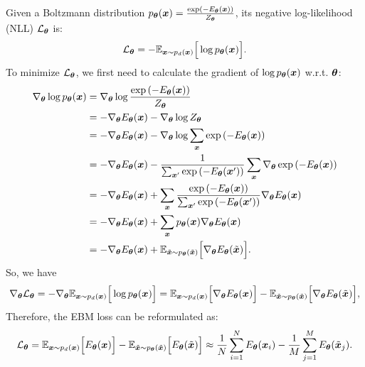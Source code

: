 Given a Boltzmann distribution $p_{{\bm{\theta}}}({\bm{x}}) = \frac{\exp (-E_{{\bm{\theta}}}({\bm{x}}))}{Z_{{\bm{\theta}}}}$, 
its negative log-likelihood (NLL) $\mathcal{L}_{{\bm{\theta}}}$ is:
\begin{equation*}
\begin{aligned}
    \mathcal{L}_{{\bm{\theta}}} = -{\mathbb{E}}_{{\bm{x}} \sim p_d({\bm{x}})} \Big[ \log p_{{\bm{\theta}}}({\bm{x}}) \Big].
\end{aligned}
\end{equation*}
To minimize $\mathcal{L}_{{\bm{\theta}}}$, we first need to calculate the gradient of $\log p_{{\bm{\theta}}}({\bm{x}})$ w.r.t. ${\bm{\theta}}$:
\begin{equation*}
\begin{aligned}
    \nabla_{\bm{\theta}} \log p_{\bm{\theta}}({\bm{x}})
    &= \nabla_{\bm{\theta}} \log \frac{\exp{(-E_{\bm{\theta}}({\bm{x}}))}} {Z_{\bm{\theta}}} \\
    &= -\nabla_{\bm{\theta}} E_{\bm{\theta}}({\bm{x}}) - \nabla_{\bm{\theta}} \log Z_{\bm{\theta}} \\
    &= -\nabla_{\bm{\theta}} E_{\bm{\theta}}({\bm{x}}) - \nabla_{\bm{\theta}} \log \sum_{{\bm{x}}} \exp{(-E_{\bm{\theta}}({\bm{x}}))} \\
    &= -\nabla_{\bm{\theta}} E_{\bm{\theta}}({\bm{x}}) - \frac{1}{\sum_{{\bm{x}}'}\exp{(-E_{\bm{\theta}}({\bm{x}}'))}} \sum_{{\bm{x}}} \nabla_{\bm{\theta}} \exp{(-E_{\bm{\theta}}({\bm{x}}))} \\
    &= -\nabla_{\bm{\theta}} E_{\bm{\theta}}({\bm{x}}) + \sum_{{\bm{x}}} \frac{\exp{(-E_{\bm{\theta}}({\bm{x}}))}}{\sum_{{\bm{x}}'}\exp{(-E_{\bm{\theta}}({\bm{x}}'))}} \nabla_{\bm{\theta}} E_{\bm{\theta}}({\bm{x}}) \\
    &= -\nabla_{\bm{\theta}} E_{\bm{\theta}}({\bm{x}}) + \sum_{{\bm{x}}} p_{{\bm{\theta}}}({\bm{x}}) \nabla_{\bm{\theta}} E_{\bm{\theta}}({\bm{x}}) \\
    &= -\nabla_{\bm{\theta}} E_{\bm{\theta}}({\bm{x}}) + {\mathbb{E}}_{\Tilde{{\bm{x}}} \sim p_{{\bm{\theta}}}(\Tilde{{\bm{x}}})} \Big[ \nabla_{\bm{\theta}} E_{\bm{\theta}}(\Tilde{{\bm{x}}}) \Big].
\end{aligned}
\end{equation*}
So, we have
\begin{equation*}
\begin{aligned}
    \nabla_{\bm{\theta}} \mathcal{L}_{\bm{\theta}} = - \nabla_{\bm{\theta}} {\mathbb{E}}_{{\bm{x}}\sim p_d({\bm{x}})} \Big[ \log p_{\bm{\theta}}({\bm{x}}) \Big] 
    = {\mathbb{E}}_{{\bm{x}} \sim p_d({\bm{x}})} \Big[ \nabla_{\bm{\theta}} E_{\bm{\theta}}({\bm{x}}) \Big] - {\mathbb{E}}_{\Tilde{{\bm{x}}} \sim p_{{\bm{\theta}}}(\Tilde{{\bm{x}}})} \Big[ \nabla_{\bm{\theta}} E_{\bm{\theta}}(\Tilde{{\bm{x}}}) \Big], 
\end{aligned}
\end{equation*}
Therefore, the EBM loss can be reformulated as:
\begin{equation*}
\begin{aligned}
        \mathcal{L}_{\bm{\theta}}
    = {\mathbb{E}}_{{\bm{x}} \sim p_d({\bm{x}})} \Big[ E_{\bm{\theta}}({\bm{x}}) \Big] - {\mathbb{E}}_{\Tilde{{\bm{x}}} \sim p_{{\bm{\theta}}}(\Tilde{{\bm{x}}})} \Big[ E_{\bm{\theta}}(\Tilde{{\bm{x}}}) \Big]
    \approx \frac{1}{N}\sum_{i=1}^N {E_{{\bm{\theta}}}}({\bm{x}}_i) - \frac{1}{M}\sum_{j=1}^M {E_{{\bm{\theta}}}}(\Tilde{{\bm{x}}}_j).
\end{aligned}
\end{equation*}

